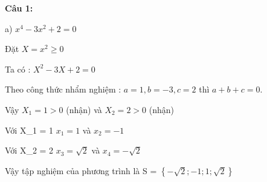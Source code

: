 \documentclass[12pt]{article}
\begin{document}
\textbf{Câu 1:}

a) $x^4 - 3x^2 + 2 = 0$ \par
Đặt $X = x^2 \geq 0$ \par
Ta có : $X^2 - 3X + 2 = 0$ \par
Theo công thức nhẩm nghiệm : $a = 1, b = -3, c = 2$ thì $a + b + c = 0$. \par
Vậy $X_1 = 1 > 0$ (nhận) và $X_2 = 2 > 0$ (nhận) \par
Với X_1 = 1 \Rightarrow $x_1 = 1$ và $x_2 = -1$ \par
Với X_2 = 2 \Rightarrow $x_3 = \sqrt{2}$ và $x_4 =- \sqrt{2}$ \par
Vậy tập nghiệm của phương trình là S = $\left\{-\sqrt{2}; -1; 1; \sqrt{2}\right\}$ \par

\   
\end{document}
